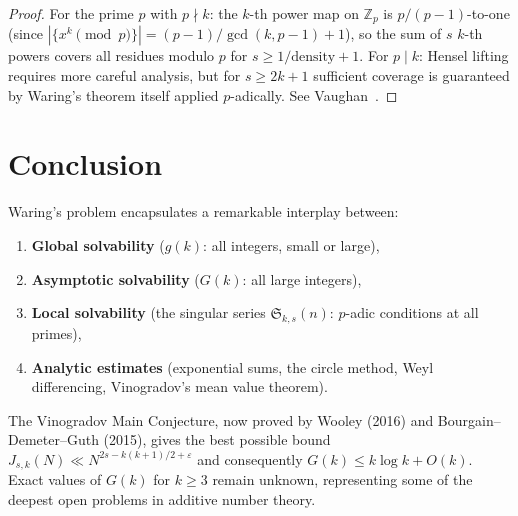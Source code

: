 \documentclass[12pt,a4paper]{amsart}
\theoremstyle{definition}
\newcommand{\Z}{\mathbb{Z}}
\begin{document}
\begin{proof}
  For the prime $p$ with $p \nmid k$: the $k$-th power map on $\Z_p$ is
  $p/(p-1)$-to-one (since $|\{x^k \pmod p\}| = (p-1)/\gcd(k,p-1) + 1$),
  so the sum of $s$ $k$-th powers covers all residues modulo $p$ for
  $s \geq 1/\text{density} + 1$.  For $p \mid k$: Hensel lifting requires
  more careful analysis, but for $s \geq 2k+1$ sufficient coverage is
  guaranteed by Waring's theorem itself applied $p$-adically.
  See Vaughan~\cite[Chapter~4]{Vaughan1981}.
\end{proof}

\section{Conclusion}

Waring's problem encapsulates a remarkable interplay between:
\begin{enumerate}
  \item \textbf{Global solvability} ($g(k)$: all integers, small or large),
  \item \textbf{Asymptotic solvability} ($G(k)$: all large integers),
  \item \textbf{Local solvability} (the singular series $\mathfrak{S}_{k,s}(n)$:
    $p$-adic conditions at all primes),
  \item \textbf{Analytic estimates} (exponential sums, the circle method,
    Weyl differencing, Vinogradov's mean value theorem).
\end{enumerate}

The Vinogradov Main Conjecture, now proved by Wooley (2016) and
Bourgain--Demeter--Guth (2015), gives the best possible bound
$J_{s,k}(N) \ll N^{2s-k(k+1)/2+\varepsilon}$ and consequently
$G(k) \leq k\log k + O(k)$.  Exact values of $G(k)$ for $k \geq 3$
remain unknown, representing some of the deepest open problems in
additive number theory.
\end{document}
